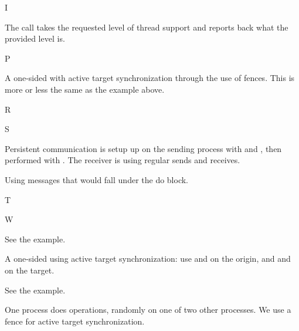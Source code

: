  {I}


The  call takes the requested level of thread support
and reports back what the provided level is.
%

 {P}


A one-sided  with active target synchronization
through the use of fences. This is more or less the same as the
 example above.
%
%

 {R}

 {S}


Persistent communication is setup up on the sending process with
 and , then
performed with . The receiver is using
regular sends and receives.
%
%


Using  messages that would fall under the
 do block.
%

 {T}

 {W}


See the  example.


A one-sided  using active target synchronization:
use  and 
on the origin, and  and
 on the target.
%


See the  example.


One process does  operations, randomly on one of
two other processes. We use a fence for active target synchronization.
%
